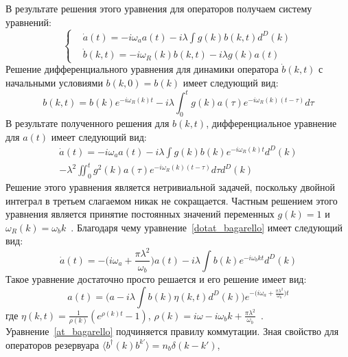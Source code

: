 В результате решения этого уравнения для операторов получаем систему уравнений:
\begin{equation}
    \begin{cases}
        & \dot{a}(t) = -i \omega_a a(t) - i \lambda \int g(k)b(k,t) d^{D}(k) \\
        & \dot{b}(k,t) = -i \omega_{R}(k) b(k,t) -i \lambda g(k)a(t)
    \end{cases}
\end{equation}
Решение дифференциального уравнения для динамики оператора $\dot{b}(k,t)$ с начальными условиями
$b(k,0)=b(k)$ имеет следующий вид:
\begin{equation}
    b(k,t) = b(k)e^{-i \omega_{R}(k) t}-i \lambda \int_{0}^{t} g(k)a(\tau)e^{-i \omega_{R}(k) (t-\tau)} d\tau
\end{equation}
В результате полученного решения для $b(k,t)$, дифференциальное уравнение для $a(t)$ имеет следующий вид:
\begin{multline}\label{dotat_bagarello}
    \dot{a}(t) =
    -i \omega_{a} a(t)
    -i \lambda \int g(k)b(k)e^{-i \omega_{R}(k) t} d^{D}(k) \\
    -\lambda^{2} \iint_{0}^{t} g^{2}(k) a(\tau) e^{-i \omega_{R}(k) (t-\tau)} d\tau d^{D}(k)
\end{multline}
Решение этого уравнения является нетривиальной задачей, поскольку двойной интеграл в третьем слагаемом
никак не сокращается.
Частным решением этого уравнения является принятие постоянных значений переменных $g(k) = 1$ и
$\omega_{R}(k) = \omega_{b} k$~\citep{bagarello2018quantum}.
Благодаря чему уравнение~\eqref{dotat_bagarello} имеет следующий вид:
\begin{equation}
    \dot{a}(t) =
    - \Biggl(i \omega_{a} + \frac{\pi \lambda^{2}}{\omega_{b}} \Biggr) a(t)
    -i \lambda \int b(k)e^{-i \omega_{b} k t} d^{D}(k)
\end{equation}
Такое уравнение достаточно просто решается и его решение имеет вид:
\begin{equation}\label{at_bagarello}
    a(t) = \Biggl( a - i \lambda \int b(k) \eta(k,t) d^{D}(k) \Biggr)
    e^{-\bigl(i \omega_{a} + \frac{\pi \lambda^{2}}{\omega_{b}} \bigr) t}
\end{equation}
где $\eta(k,t) = \frac{1}{\rho(k)}(e^{\rho(k) t} - 1)$,
$\rho(k) = i\omega - i\omega_{b} k + \frac{\pi \lambda^{2}}{\omega_{b}}$~\citep{bagarello2018quantum}.
Уравнение~\eqref{at_bagarello} подчиняется правилу коммутации.
Зная свойство для операторов резервуара $\langle b^{\dagger}(k) b^{k'} \rangle = n_{b} \delta (k-k')$,
